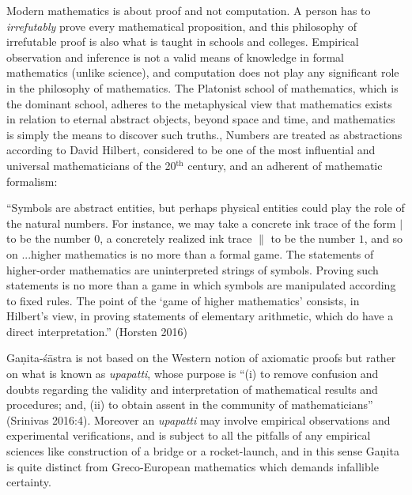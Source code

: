 Modern mathematics is about proof and not computation. A person has to {\sl irrefutably} prove every mathematical proposition, and this philosophy of irrefutable proof is also what is taught in schools and colleges. Empirical observation and inference is not a valid means of knowledge in formal mathematics (unlike science), and computation does not play any significant role in the philosophy of mathematics. The Platonist school of mathematics, which is the dominant school, adheres to the metaphysical view that mathematics exists in relation to eternal abstract objects, beyond space and time, and mathematics is simply the means to discover such truths., Numbers are treated as abstractions according to David Hilbert,  considered to be one of the most influential and universal mathematicians of the 20$^{\text{th}}$ century, and an adherent of mathematic formalism: 
\begin{myquote}
``Symbols are abstract entities, but perhaps physical entities could play the role of the natural numbers. For instance, we may take a concrete ink trace of the form $|$ to be the number $0$, a concretely realized ink trace $\|$ to be the number $1$, and so on ...higher mathematics is no more than a formal game. The statements of higher-order mathematics are uninterpreted strings of symbols. Proving such statements is no more than a game in which symbols are manipulated according to fixed rules. The point of the `game of higher mathematics' consists, in Hilbert's view, in proving statements of elementary arithmetic, which do have a direct interpretation.''
\hfill 	(Horsten 2016)
\end{myquote}

Gaṇita-śāstra is not based on the Western notion of axiomatic proofs but rather on what is known as {\sl upapatti}, whose purpose is ``(i) to remove confusion and doubts regarding the validity and interpretation of mathematical results and procedures; and, (ii) to obtain assent in the community of mathematicians'' (Srinivas 2016:4). Moreover an {\sl upapatti} may involve empirical observations and experimental verifications, and is subject to all the pitfalls of any empirical sciences like construction of a bridge or a rocket-launch, and in this sense Gaṇita is quite distinct from Greco-European mathematics which demands infallible certainty.

